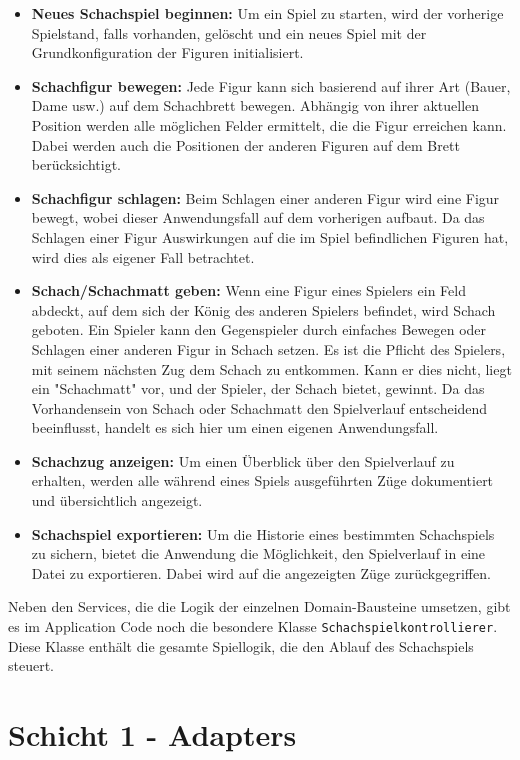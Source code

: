 \begin{itemize}
    \item \textbf{Neues Schachspiel beginnen:} Um ein Spiel zu starten, wird der vorherige Spielstand, falls vorhanden, gelöscht und ein neues Spiel mit der Grundkonfiguration der Figuren initialisiert.
    \item \textbf{Schachfigur bewegen:} Jede Figur kann sich basierend auf ihrer Art (Bauer, Dame usw.) auf dem Schachbrett bewegen. 
    Abhängig von ihrer aktuellen Position werden alle möglichen Felder ermittelt, die die Figur erreichen kann. 
    Dabei werden auch die Positionen der anderen Figuren auf dem Brett berücksichtigt.
    \item \textbf{Schachfigur schlagen:} Beim Schlagen einer anderen Figur wird eine Figur bewegt, wobei dieser Anwendungsfall auf dem vorherigen aufbaut. 
    Da das Schlagen einer Figur Auswirkungen auf die im Spiel befindlichen Figuren hat, wird dies als eigener Fall betrachtet.
    \item \textbf{Schach/Schachmatt geben:} Wenn eine Figur eines Spielers ein Feld abdeckt, auf dem sich der König des anderen Spielers befindet, wird Schach geboten. 
    Ein Spieler kann den Gegenspieler durch einfaches Bewegen oder Schlagen einer anderen Figur in Schach setzen. 
    Es ist die Pflicht des Spielers, mit seinem nächsten Zug dem Schach zu entkommen. 
    Kann er dies nicht, liegt ein "Schachmatt" vor, und der Spieler, der Schach bietet, gewinnt. 
    Da das Vorhandensein von Schach oder Schachmatt den Spielverlauf entscheidend beeinflusst, handelt es sich hier um einen eigenen Anwendungsfall.
    \item \textbf{Schachzug anzeigen:} Um einen Überblick über den Spielverlauf zu erhalten, werden alle während eines Spiels ausgeführten Züge dokumentiert und übersichtlich angezeigt.
    \item \textbf{Schachspiel exportieren:} Um die Historie eines bestimmten Schachspiels zu sichern, bietet die Anwendung die Möglichkeit, den Spielverlauf in eine Datei zu exportieren. Dabei wird auf die angezeigten Züge zurückgegriffen.
\end{itemize}

Neben den Services, die die Logik der einzelnen Domain-Bausteine umsetzen, gibt es im Application Code noch die besondere Klasse \texttt{Schachspielkontrollierer}. 
Diese Klasse enthält die gesamte Spiellogik, die den Ablauf des Schachspiels steuert.

\newpage

\section{Schicht 1 - Adapters}

